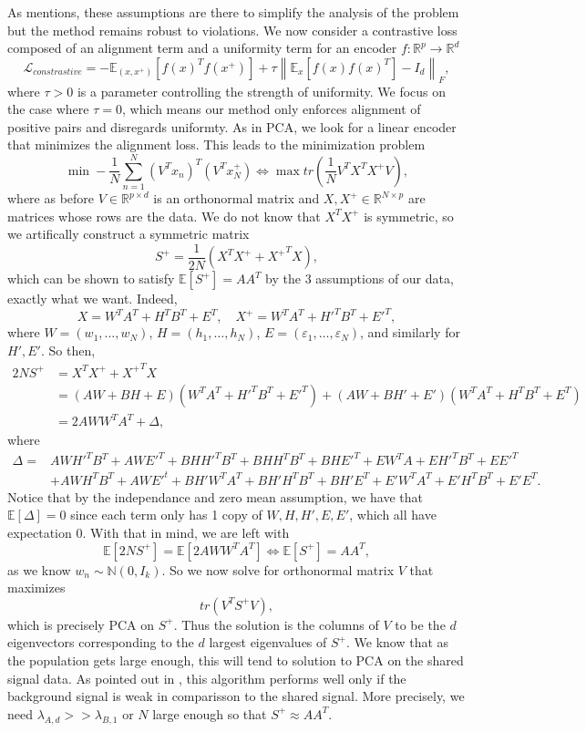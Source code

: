 \documentclass[12pt]{article}
\newcommand{\R}{\mathbb{R}}
\newcommand{\norm}[1]{\left\lVert#1\right\rVert}
\begin{document}
As \cite{wu2025pcauniformityinducesrobustness} mentions, these assumptions are there to simplify the analysis of the problem but the method remains robust to violations. We now consider a contrastive loss composed of an alignment term and a uniformity term for an encoder $f: \R^p \to \R^d$
\[
\mathcal{L}_{constrastive} = - \mathbb{E}_{(x,x^+)} \left[f(x)^Tf(x^+)\right] + \tau \norm{\mathbb{E}_x\left[f(x)f(x)^T\right] - I_d}_F,
\]
where $\tau > 0$ is a parameter controlling the strength of uniformity. We focus on the case where $\tau = 0$, which means our method only enforces alignment of positive pairs and disregards uniformty. As in PCA, we look for a linear encoder that minimizes the alignment loss. This leads to the minimization problem
\[
\min -\frac{1}{N} \sum_{n = 1}^{N} \left(V^T x_n\right)^T \left(V^T x_N^+\right) \iff \max tr\left(\frac{1}{N} V^T X^T X^+ V\right),
\]
where as before $V \in \R^{p \times d}$ is an orthonormal matrix and $X, X^+ \in \R^{N \times p}$ are matrices whose rows are the data. We do not know that $X^T X^+$ is symmetric, so we artifically construct a symmetric matrix
\[
S^+ = \frac{1}{2N}\left(X^T X^+ + {X^+}^T X\right),
\]
which can be shown to satisfy $\mathbb{E}[S^+] = AA^T$ by the 3 assumptions of our data, exactly what we want. Indeed,
\[
X = W^T A^T + H^T B^T + E^T, \quad X^+ = W^T A^T + H'^T B^T + E'^T,
\]
where $W = (w_1, \dots, w_N)$, $H = (h_1, \dots, h_N)$, $E = (\varepsilon_1, \dots, \varepsilon_N)$, and similarly for $H', E'$. So then,
\[
\begin{split}
   2N S^+ &= X^TX^+ + {X^+}^TX \\
   &= (AW + BH + E)(W^T A^T + H'^T B^T + E'^T) + (AW + BH' + E')(W^TA^T + H^TB^T + E^T) \\
   &= 2AWW^TA^T + \Delta, 
\end{split}
\]
where
\[
\begin{split}
    \Delta = &AWH'^TB^T + AWE'^T + BHH'^TB^T + BHH^TB^T +BHE'^T + EW^TA + EH'^TB^T + EE'^T \\
    &+ AWH^TB^T + AWE'^t + BH'W^TA^T + BH'H^TB^T+BH'E^T + E'W^TA^T + E'H^TB^T + E'E^T.
\end{split}
\]
Notice that by the independance and zero mean assumption, we have that $\mathbb{E}[\Delta] = 0$ since each term only has 1 copy of $W,H,H',E,E'$, which all have expectation 0. With that in mind, we are left with
\[
\mathbb{E}[2NS^+] = \mathbb{E}[2AWW^TA^T] \iff \mathbb{E}[S^+] = AA^T,
\]
as we know $w_n \sim \mathbb{N}(0, I_k)$. So we now solve for orthonormal matrix $V$ that maximizes
\[
tr(V^T S^+ V),
\]
which is precisely PCA on $S^+$. Thus the solution is the columns of $V$ to be the $d$ eigenvectors corresponding to the $d$ largest eigenvalues of $S^+$. We know that as the population gets large enough, this will tend to solution to PCA on the shared signal data. As pointed out in \cite{wu2025pcauniformityinducesrobustness}, this algorithm performs well only if the background signal is weak in comparisson to the shared signal. More precisely, we need $\lambda_{A,d} >> \lambda_{B,1}$ or $N$ large enough so that $S^+ \approx AA^T$.
\end{document}
